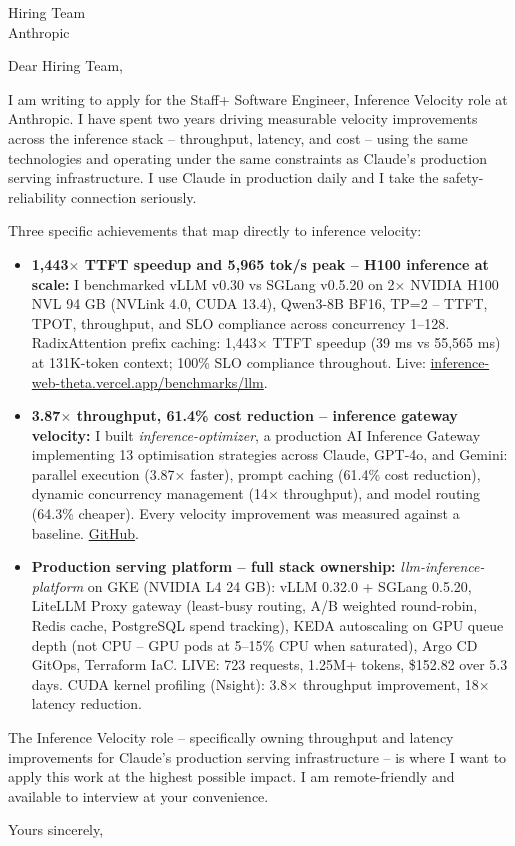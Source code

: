 \documentclass[a4paper]{letter}
\date{\today}
\begin{document}
\begin{letter}{Hiring Team \\ Anthropic}

\opening{Dear Hiring Team,}

I am writing to apply for the Staff+ Software Engineer, Inference Velocity role at Anthropic. I have spent two years driving measurable velocity improvements across the inference stack -- throughput, latency, and cost -- using the same technologies and operating under the same constraints as Claude's production serving infrastructure. I use Claude in production daily and I take the safety-reliability connection seriously.

Three specific achievements that map directly to inference velocity:

\begin{itemize}
  \item \textbf{1,443$\times$ TTFT speedup and 5,965 tok/s peak -- H100 inference at scale:} I benchmarked vLLM v0.30 vs SGLang v0.5.20 on 2$\times$ NVIDIA H100 NVL 94 GB (NVLink 4.0, CUDA 13.4), Qwen3-8B BF16, TP=2 -- TTFT, TPOT, throughput, and SLO compliance across concurrency 1--128. RadixAttention prefix caching: 1,443$\times$ TTFT speedup (39 ms vs 55,565 ms) at 131K-token context; 100\% SLO compliance throughout. Live: \href{https://inference-web-theta.vercel.app/benchmarks/llm}{inference-web-theta.vercel.app/benchmarks/llm}.

  \item \textbf{3.87$\times$ throughput, 61.4\% cost reduction -- inference gateway velocity:} I built \textit{inference-optimizer}, a production AI Inference Gateway implementing 13 optimisation strategies across Claude, GPT-4o, and Gemini: parallel execution (3.87$\times$ faster), prompt caching (61.4\% cost reduction), dynamic concurrency management (14$\times$ throughput), and model routing (64.3\% cheaper). Every velocity improvement was measured against a baseline. \href{https://github.com/AyeniOluwatosinOlawale/inference-optimizer}{GitHub}.

  \item \textbf{Production serving platform -- full stack ownership:} \textit{llm-inference-platform} on GKE (NVIDIA L4 24 GB): vLLM 0.32.0 + SGLang 0.5.20, LiteLLM Proxy gateway (least-busy routing, A/B weighted round-robin, Redis cache, PostgreSQL spend tracking), KEDA autoscaling on GPU queue depth (not CPU -- GPU pods at 5--15\% CPU when saturated), Argo CD GitOps, Terraform IaC. LIVE: 723 requests, 1.25M+ tokens, \$152.82 over 5.3 days. CUDA kernel profiling (Nsight): 3.8$\times$ throughput improvement, 18$\times$ latency reduction.
\end{itemize}

The Inference Velocity role -- specifically owning throughput and latency improvements for Claude's production serving infrastructure -- is where I want to apply this work at the highest possible impact. I am remote-friendly and available to interview at your convenience.

\closing{Yours sincerely,}

\end{letter}
\end{document}
